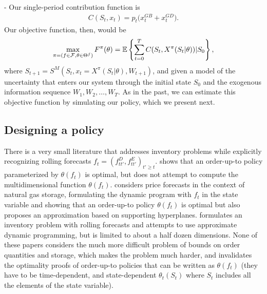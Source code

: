 \documentclass[11pt,oneside,fleqn,reqno,titlepage]{article}
\newcommand{\E}{\mathbb{E}}
\newcommand{\bn}{\begin{eqnarray}}
\newcommand{\en}{\end{eqnarray}}
\newcommand{\bns}{\begin{eqnarray*}}
\newcommand{\ens}{\end{eqnarray*}}
\def \xtilde{{\tilde x}}
\def \Fcal{{\cal F}}
\begin{document}
 - Our single-period contribution function is
\bns
C(S_t,x_t) = p_t \big(x^{GB}_t + x^{GD}_t\big).
\ens
Our objective function, then, would be
\bn
\max_{\pi=(f\in\Fcal,\theta\in\Theta^f)} F^\pi(\theta) = \E\left\{\sum_{t=0}^T C(S_t,X^\pi(S_t|\theta))|S_0\right\}, \label{eq:cfaenergyobjective}
\en
where $S_{t+1} = S^M(S_t,x_t=X^\pi(S_t|\theta),W_{t+1})$, and given a model of the uncertainty that enters our system through the initial state $S_0$ and the exogenous information sequence $W_1, W_2, \ldots, W_T$.  As in the past, we can estimate this objective function by simulating our policy, which we present next.



\subsection{Designing a policy}



There is a very small literature that addresses inventory problems while explicitly recognizing rolling forecasts $f_t = (f^D_{tt'},f^E_{tt'})_{t'\geq t}$.  \cite{Iida2006} shows that an order-up-to policy parameterized by $\theta(f_t)$ is optimal, but does not attempt to compute the multidimensional function $\theta(f_t)$.  \cite{Lai2008} considers price forecasts in the context of natural gas storage, formulating the dynamic program with $f_t$ in the state variable and showing that an order-up-to policy $\theta(f_t)$ is optimal  but also proposes an approximation based on supporting hyperplanes.  \cite{Chen1999} formulates an inventory problem with rolling forecasts and attempts to use approximate dynamic programming, but is limited to about a half dozen dimensions.  None of these papers considers the much more difficult problem of bounds on order quantities and storage, which makes the problem much harder, and invalidates the optimality proofs of order-up-to policies that can be written as $\theta(f_t)$ (they have to be time-dependent, and state-dependent $\theta_t(S_t)$ where $S_t$ includes all the elements of the state variable).
\end{document}
